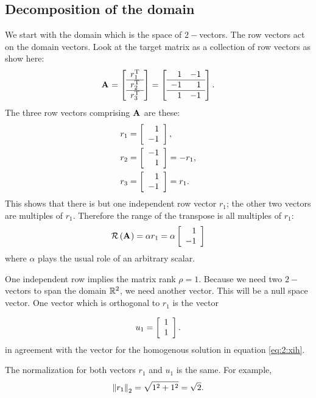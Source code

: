 \subsection{Decomposition of the domain}\label{domain}
We start with the domain which is the space of $2-$vectors. The row vectors act on the domain vectors. Look at the target matrix as a collection of row vectors as show here: 
\begin{equation}
  \A{} = \mat{c}
  {
  r_{1}^{\mathrm{T}}\\\hline
  r_{2}^{\mathrm{T}}\\\hline
  r_{3}^{\mathrm{T}}
  } 
  =
  \mat{rr}
  {
   1 & -1 \\ \hline
  -1 &  1 \\ \hline
   1 & -1 \\ 
  }.
\end{equation}
The three row vectors comprising $\A{}$ are these:
\begin{equation}
  \begin{split}
    r_{1} &= \mat{r}{1\\-1},\\
    r_{2} &= \mat{r}{-1\\1} = -r_{1},\\
    r_{3} &= \mat{r}{1\\-1} =  r_{1}.\\
  \end{split}
\end{equation}
This shows that there is but one independent row vector $r_{1}$; the other two vectors are multiples of $r_{1}$. Therefore the range of the transpose is all multiples of $r_{1}$:
\begin{equation}
  \rng{\A{}} = \alpha r_{1} = \alpha \mat{r}{1\\-1}
\end{equation}
where $\alpha$ plays the usual role of an arbitrary scalar.

One independent row implies the matrix rank $\rho = 1$. Because we need two $2-$vectors to span the domain $\real{2}$, we need another vector. This will be a null space vector. One vector which is orthogonal to $r_{1}$ is the vector

\begin{equation}
 u_{1} = \mat{r}{1\\1}.
\end{equation}
in agreement with the vector for the homogenous solution in equation \eqref{eq:2:xih}. 

The normalization for both vectors $r_{1}$ and $u_{1}$ is the same. For example,
\begin{equation}
  \normt{r_{1}} = \sqrt{1^{2}+1^{2}} = \sqrt{2}.
\end{equation}

